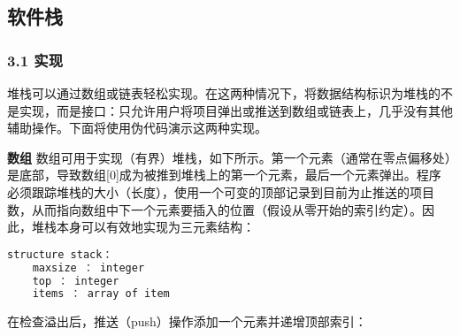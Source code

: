 \subsection{软件栈}
\subsubsection{3.1 实现}
堆栈可以通过数组或链表轻松实现。在这两种情况下，将数据结构标识为堆栈的不是实现，而是接口：只允许用户将项目弹出或推送到数组或链表上，几乎没有其他辅助操作。下面将使用伪代码演示这两种实现。

\textbf{数组}
数组可用于实现（有界）堆栈，如下所示。第一个元素（通常在零点偏移处）是底部，导致数组[0]成为被推到堆栈上的第一个元素，最后一个元素弹出。程序必须跟踪堆栈的大小（长度），使用一个可变的顶部记录到目前为止推送的项目数，从而指向数组中下一个元素要插入的位置（假设从零开始的索引约定）。因此，堆栈本身可以有效地实现为三元素结构：
\begin{lstlisting}[language=cpp]
structure stack：
    maxsize ： integer
    top ： integer
    items ： array of item
\end{lstlisting}


在检查溢出后，推送（push）操作添加一个元素并递增顶部索引：